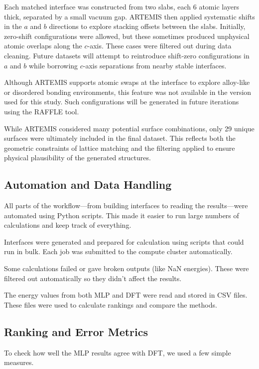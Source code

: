 Each matched interface was constructed from two slabs, each 6 atomic layers thick, separated by a small vacuum gap. ARTEMIS then applied systematic shifts in the $a$ and $b$ directions to explore stacking offsets between the slabs. Initially, zero-shift configurations were allowed, but these sometimes produced unphysical atomic overlaps along the $c$-axis. These cases were filtered out during data cleaning. Future datasets will attempt to reintroduce shift-zero configurations in $a$ and $b$ while borrowing $c$-axis separations from nearby stable interfaces.

Although ARTEMIS supports atomic swaps at the interface to explore alloy-like or disordered bonding environments, this feature was not available in the version used for this study. Such configurations will be generated in future iterations using the RAFFLE tool.

While ARTEMIS considered many potential surface combinations, only 29 unique surfaces were ultimately included in the final dataset. This reflects both the geometric constraints of lattice matching and the filtering applied to ensure physical plausibility of the generated structures.

\subsection{Automation and Data Handling}

All parts of the workflow—from building interfaces to reading the results—were automated using Python scripts. This made it easier to run large numbers of calculations and keep track of everything.

Interfaces were generated and prepared for calculation using scripts that could run in bulk. Each job was submitted to the compute cluster automatically.

Some calculations failed or gave broken outputs (like NaN energies). These were filtered out automatically so they didn’t affect the results.

The energy values from both MLP and DFT were read and stored in CSV files. These files were used to calculate rankings and compare the methods.

\subsection{Ranking and Error Metrics}

To check how well the MLP results agree with DFT, we used a few simple measures.

